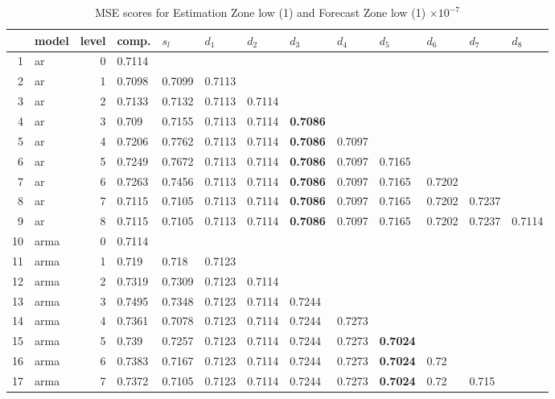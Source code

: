\documentclass[10pt,a4paper]{article}
\begin{document}
\begin{table}[ht]
\centering
\caption{MSE scores for Estimation Zone low (1) and Forecast Zone low (1) $ \times 10^{-7}$} 
\begin{tabular}{rlrllllllllll}
  \hline
 & model & level & comp. & $s_l$ & $d_1$ & $d_2$ & $d_3$ & $d_4$ & $d_5$ & $d_6$ & $d_7$ & $d_8$ \\ 
  \hline
1 & ar &     0 & 0.7114 &  &  &  &  &  &  &  &  &  \\ 
  2 & ar &     1 & 0.7098 & 0.7099 & 0.7113 &  &  &  &  &  &  &  \\ 
  3 & ar &     2 & 0.7133 & 0.7132 & 0.7113 & 0.7114 &  &  &  &  &  &  \\ 
  4 & ar &     3 & 0.709 & 0.7155 & 0.7113 & 0.7114 & \textbf{0.7086} &  &  &  &  &  \\ 
  5 & ar &     4 & 0.7206 & 0.7762 & 0.7113 & 0.7114 & \textbf{0.7086} & 0.7097 &  &  &  &  \\ 
  6 & ar &     5 & 0.7249 & 0.7672 & 0.7113 & 0.7114 & \textbf{0.7086} & 0.7097 & 0.7165 &  &  &  \\ 
  7 & ar &     6 & 0.7263 & 0.7456 & 0.7113 & 0.7114 & \textbf{0.7086} & 0.7097 & 0.7165 & 0.7202 &  &  \\ 
  8 & ar &     7 & 0.7115 & 0.7105 & 0.7113 & 0.7114 & \textbf{0.7086} & 0.7097 & 0.7165 & 0.7202 & 0.7237 &  \\ 
  9 & ar &     8 & 0.7115 & 0.7105 & 0.7113 & 0.7114 & \textbf{0.7086} & 0.7097 & 0.7165 & 0.7202 & 0.7237 & 0.7114 \\ 
   \hline
10 & arma &     0 & 0.7114 &  &  &  &  &  &  &  &  &  \\ 
  11 & arma &     1 & 0.719 & 0.718 & 0.7123 &  &  &  &  &  &  &  \\ 
  12 & arma &     2 & 0.7319 & 0.7309 & 0.7123 & 0.7114 &  &  &  &  &  &  \\ 
  13 & arma &     3 & 0.7495 & 0.7348 & 0.7123 & 0.7114 & 0.7244 &  &  &  &  &  \\ 
  14 & arma &     4 & 0.7361 & 0.7078 & 0.7123 & 0.7114 & 0.7244 & 0.7273 &  &  &  &  \\ 
  15 & arma &     5 & 0.739 & 0.7257 & 0.7123 & 0.7114 & 0.7244 & 0.7273 & \textbf{0.7024} &  &  &  \\ 
  16 & arma &     6 & 0.7383 & 0.7167 & 0.7123 & 0.7114 & 0.7244 & 0.7273 & \textbf{0.7024} & 0.72 &  &  \\ 
  17 & arma &     7 & 0.7372 & 0.7105 & 0.7123 & 0.7114 & 0.7244 & 0.7273 & \textbf{0.7024} & 0.72 & 0.715 &  \\ 

\end{tabular}
\end{table}
\end{document}
